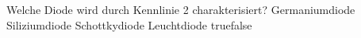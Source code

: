     {Welche Diode wird durch Kennlinie 2 charakterisiert?}
    {Germaniumdiode}
    {Siliziumdiode}
    {Schottkydiode}
    {Leuchtdiode}
    {true}{false}